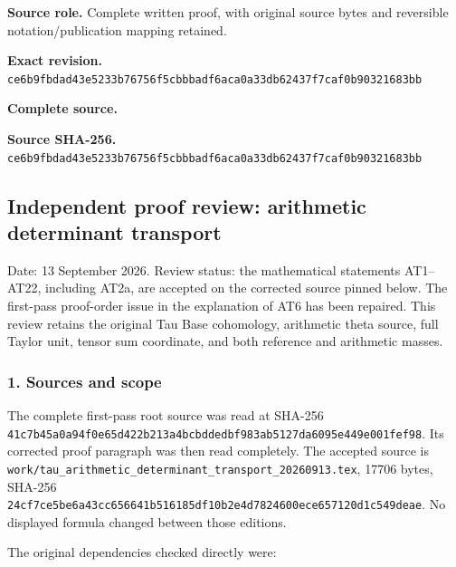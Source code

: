 \documentclass{article}
\begin{document}
\maketitle
\begingroup
\sloppy
\small

\noindent\textbf{Source role.} Complete written proof, with original source bytes and reversible notation/publication mapping retained.\par
\noindent\textbf{Exact revision.} \nolinkurl{ce6b9fbdad43e5233b76756f5cbbbadf6aca0a33db62437f7caf0b90321683bb}\par
\noindent\textbf{Complete source.} \par
\noindent\textbf{Source SHA-256.} \nolinkurl{ce6b9fbdad43e5233b76756f5cbbbadf6aca0a33db62437f7caf0b90321683bb}\par\medskip
\subsection{Independent proof review: arithmetic determinant transport}\label{endpoint-determinant_review--independent-proof-review-arithmetic-determinant-transport}

Date: 13 September 2026. Review status: the mathematical statements AT1--AT22, including AT2a, are accepted on the corrected source pinned below. The first-pass proof-order issue in the explanation of AT6 has been repaired. This review retains the original Tau Base cohomology, arithmetic theta source, full Taylor unit, tensor sum coordinate, and both reference and arithmetic masses.

\subsubsection{1. Sources and scope}\label{endpoint-determinant_review--sources-and-scope}

The complete first-pass root source was read at SHA-256 \nolinkurl{41c7b45a0a94f0e65d422b213a4bcbddedbf983ab5127da6095e449e001fef98}. Its corrected proof paragraph was then read completely. The accepted source is \nolinkurl{work/tau_arithmetic_determinant_transport_20260913.tex}, 17706 bytes, SHA-256 \nolinkurl{24cf7ce5be6a43cc656641b516185df10b2e4d7824600ece657120d1c549deae}. No displayed formula changed between those editions.

The original dependencies checked directly were:
\end{document}
